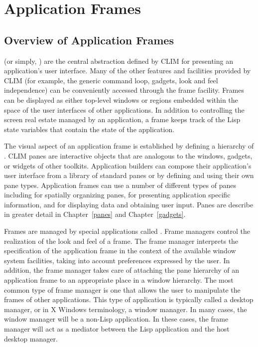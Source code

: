 
\chapter {Application Frames}
\label {application-frames}

\section {Overview of Application Frames}

 (or simply, ) are the central
abstraction defined by CLIM for presenting an application's user interface.
Many of the other features and facilities provided by CLIM (for example, the
generic command loop, gadgets, look and feel independence) can be conveniently
accessed through the frame facility.  Frames can be displayed as either
top-level windows or regions embedded within the space of the user interfaces of
other applications.  In addition to controlling the screen real estate managed
by an application, a frame keeps track of the Lisp state variables that contain
the state of the application.

The visual aspect of an application frame is established by defining a hierarchy
of .  CLIM panes are interactive objects that are analogous to
the windows, gadgets, or widgets of other toolkits.  Application builders can
compose their application's user interface from a library of standard panes or
by defining and using their own pane types.  Application frames can use a number
of different types of panes including  for spatially
organizing panes,  for presenting application specific
information, and  for displaying data and obtaining user
input.  Panes are describe in greater detail in Chapter~\ref{panes} and
Chapter~\ref{gadgets}.

Frames are managed by special applications called .
Frame managers control the realization of the look and feel of a frame.  The
frame manager interprets the specification of the application frame in the
context of the available window system facilities, taking into account
preferences expressed by the user.  In addition, the frame manager takes care of
attaching the pane hierarchy of an application frame to an appropriate place in
a window hierarchy.  The most common type of frame manager is one that allows
the user to manipulate the frames of other applications.  This type of
application is typically called a desktop manager, or in X Windows terminology,
a window manager.  In many cases, the window manager will be a non-Lisp
application.  In these cases, the frame manager will act as a mediator between
the Lisp application and the host desktop manager.

